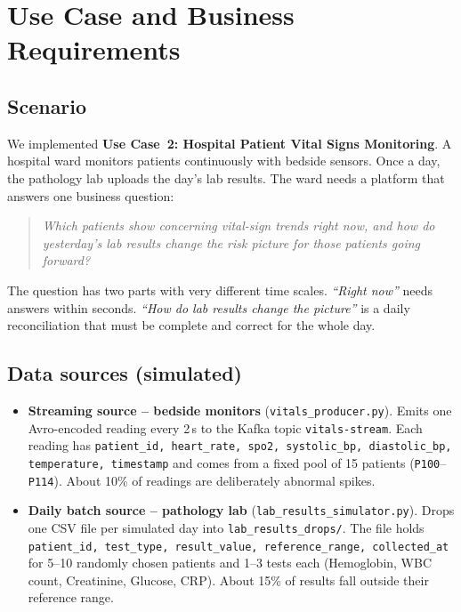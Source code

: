 \documentclass[11pt,a4paper]{article}
\newcommand{\code}[1]{\nolinkurl{#1}}
\begin{document}
\tableofcontents
\newpage

\section{Use Case and Business Requirements}
\subsection{Scenario}
We implemented \textbf{Use Case~2: Hospital Patient Vital Signs Monitoring}. A hospital ward
monitors patients continuously with bedside sensors. Once a day, the pathology lab uploads the
day's lab results. The ward needs a platform that answers one business question:

\begin{quote}
\itshape Which patients show concerning vital-sign trends right now, and how do yesterday's lab
results change the risk picture for those patients going forward?
\end{quote}

The question has two parts with very different time scales. \emph{``Right now''} needs
answers within seconds. \emph{``How do lab results change the picture''} is a daily
reconciliation that must be complete and correct for the whole day.

\subsection{Data sources (simulated)}
\begin{itemize}
  \item \textbf{Streaming source -- bedside monitors} (\code{vitals_producer.py}). Emits one
  Avro-encoded reading every 2\,s to the Kafka topic \code{vitals-stream}. Each reading has
  \code{patient_id, heart_rate, spo2, systolic_bp, diastolic_bp, temperature, timestamp} and
  comes from a fixed pool of 15 patients (\code{P100}--\code{P114}). About 10\% of readings
  are deliberately abnormal spikes.
  \item \textbf{Daily batch source -- pathology lab} (\code{lab_results_simulator.py}). Drops one
  CSV file per simulated day into \code{lab_results_drops/}. The file holds
  \code{patient_id, test_type, result_value, reference_range, collected_at} for 5--10 randomly
  chosen patients and 1--3 tests each (Hemoglobin, WBC count, Creatinine, Glucose, CRP).
  About 15\% of results fall outside their reference range.
\end{itemize}
\end{document}
